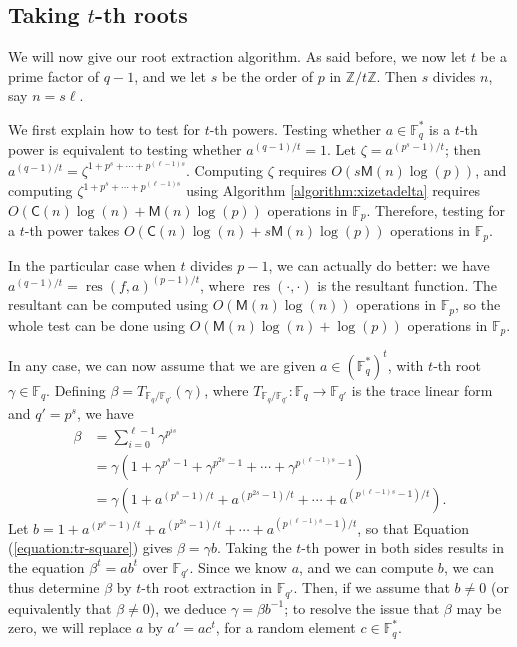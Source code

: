 \documentclass[12pt]{article}
\theoremstyle{plain}
\theoremstyle{definition}
\newcommand{\refequation}[1]{Equation (\ref{#1})}
\newcommand{\refalgorithm}[1]{Algorithm \ref{#1}}
\def\F{\mathbb{F}}
\def\M{\mathsf{M}}
\def\CC{\mathsf{C}}
\newcounter{algorithm}
\begin{document}
\subsection{Taking $t$-th roots} 

We will now give our root extraction algorithm. As said before, we now
let $t$ be a prime factor of $q-1$, and we let $s$ be the order of $p$
in $\mathbb{Z}/t\mathbb{Z}$. Then $s$ divides $n$, say $n = s\ell$.

We first explain how to test for $t$-th powers. Testing whether $a
\in \F_q^*$ is a $t$-th power is equivalent to testing whether
$a^{(q-1)/t}=1$. Let $\zeta = a^{(p^s - 1) / t}$; then $a^{(q - 1) /
  t} = \zeta^{1 + p^s + \cdots + p^{(\ell - 1)s}}$. Computing $\zeta$
requires $O(s\M(n)\log(p))$, and computing $\zeta^{1 + p^s + \cdots +
  p^{(\ell - 1)s}}$ using \refalgorithm{algorithm:xizetadelta}
requires $O(\CC(n)\log(n) + \M(n)\log(p))$ operations in
$\F_p$. Therefore, testing for a $t$-th power takes $O(\CC(n)\log(n) +
s\M(n)\log(p))$ operations in $\F_p$.

In the particular case when $t$ divides $p - 1$, we can actually do
better: we have $a^{(q - 1) / t} = \operatorname{res}(f, a)^{(p - 1) /
  t}$, where $\operatorname{res}(\cdot, \cdot)$ is the resultant
function. The resultant can be computed using $O(\M(n)\log(n))$
operations in $\F_p$, so the whole test can be done using
$O(\M(n)\log(n)+\log(p))$ operations in $\F_p$.

In any case, we can now assume that we are given $a \in (\F_q^*)^t$,
with $t$-th root $\gamma \in \F_q$. 
Defining $\beta = T_{\F_q / \F_{q'}}(\gamma)$, where
$T_{\F_q / \F_{q'}}:\F_q \to \F_{q'}$ is the trace linear form and
$q' = p^s$, we have
\begin{align}
\label{equation:tr-square}
\beta 
& = \sum_{i = 0}^{\ell - 1} \gamma^{p^{is}} \nonumber \\
& = \gamma(1 + \gamma^{p^s - 1} + \gamma^{p^{2s} - 1} + \cdots + \gamma^{p^{(\ell - 1)s} - 1}) \nonumber \\
& = \gamma(1 + a^{(p^s - 1) / t} + a^{(p^{2s} - 1) / t} + \cdots + a^{(p^{(\ell - 1)s} -1) / t}).
\end{align}
Let $b = 1 + a^{(p^s - 1) / t} + a^{(p^{2s} - 1) / t} + \cdots +
a^{(p^ {(\ell - 1)s} -1) / t}$, so that
\refequation{equation:tr-square} gives $\beta = \gamma b$.  Taking the
$t$-th power in both sides results in the equation $\beta^t = ab^t$
over $\F_{q'}$. Since we know $a$, and we can compute $b$, we can thus
determine $\beta$ by $t$-th root extraction in $\F_{q'}$. Then, if we
assume that $b \ne 0$ (or equivalently that $\beta \ne 0$), we deduce
$\gamma = \beta b^{-1}$; to resolve the issue that $\beta$ may be
zero, we will replace $a$ by $a'=ac^t$, for a random element $c \in
\F_q^*$.
\end{document}
